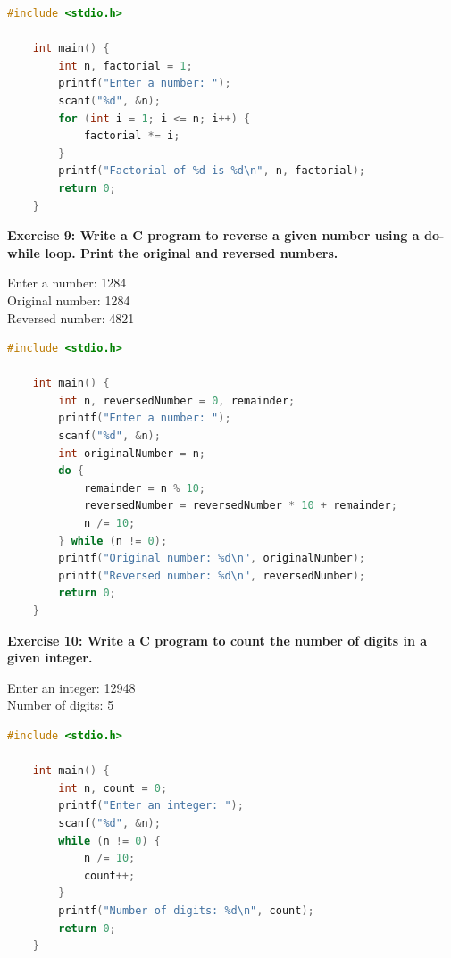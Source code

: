 \documentclass[12pt, openany]{book}
\begin{document}
\begin{lstlisting}[language=C, gobble=0, caption=Solution to Exercise 8]
    #include <stdio.h>
    
    int main() {
        int n, factorial = 1;
        printf("Enter a number: ");
        scanf("%d", &n);
        for (int i = 1; i <= n; i++) {
            factorial *= i;
        }
        printf("Factorial of %d is %d\n", n, factorial);
        return 0;
    }
\end{lstlisting}

\noindent\textbf{Exercise 9: Write a C program to reverse a given number using a do-while loop.	Print the original and reversed numbers.}
\begin{tcolorbox}[colback=lightgray!10, colframe=black, title=Example Output]
    Enter a number: 1284 \\
    Original number: 1284 \\
    Reversed number: 4821
\end{tcolorbox}

\begin{lstlisting}[language=C, gobble=0, caption=Solution to Exercise 9]
    #include <stdio.h>
    
    int main() {
        int n, reversedNumber = 0, remainder;
        printf("Enter a number: ");
        scanf("%d", &n);
        int originalNumber = n;
        do {
            remainder = n % 10;
            reversedNumber = reversedNumber * 10 + remainder;
            n /= 10;
        } while (n != 0);
        printf("Original number: %d\n", originalNumber);
        printf("Reversed number: %d\n", reversedNumber);
        return 0;
    }
\end{lstlisting}

\noindent\textbf{Exercise 10: Write a C program to count the number of digits in a given integer.}
\begin{tcolorbox}[colback=lightgray!10, colframe=black, title=Example Output]
    Enter an integer: 12948 \\
    Number of digits: 5
\end{tcolorbox}

\begin{lstlisting}[language=C, gobble=0, caption=Solution to Exercise 10]
    #include <stdio.h>
    
    int main() {
        int n, count = 0;
        printf("Enter an integer: ");
        scanf("%d", &n);
        while (n != 0) {
            n /= 10;
            count++;
        }
        printf("Number of digits: %d\n", count);
        return 0;
    }
\end{lstlisting}
\end{document}
